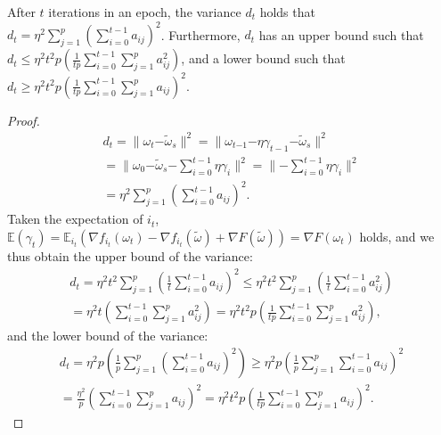 \documentclass[letterpaper]{article}
\begin{document}
\begin{Theorem}
\label{theorem_vr_lower_bound}
   After $t$ iterations in an epoch, the variance $d_t$ holds that $d_t \mathrm{=} \eta^2 \sum\limits_{j=1}^p\left(  \sum\limits_{i=0}^{t-1} a_{ij}  \right)^2$. Furthermore, $d_t$ has an upper bound such that 
   $d_t \mathrm{\le} \eta^2 t^2p  \left( \frac{1}{tp}\sum\limits_{i=0}^{t-1}   \sum\limits_{j=1}^p   a_{ij}^2 \right)$, and a lower bound such that $d_t  \mathrm{\ge} \eta^2t^2p \left(\frac{1}{tp}\sum\limits_{i=0}^{t-1}   \sum\limits_{j=1}^p   a_{ij}\right)^2$.
\end{Theorem}
\begin{proof}
\begin{equation}
\begin{array}{ll}
d_{t} = \parallel \omega_{t}\mathrm{-}\tilde{\omega}_s \parallel^2 
=\parallel \omega_{{t\mathrm{-}1}}\mathrm{-}\eta \gamma_{t-1} \mathrm{-}\tilde{\omega}_s \parallel^2\\
= \parallel \omega_{0}\mathrm{-}\tilde{\omega}_s  \mathrm{-} \sum\limits_{i=0}^{t-1} \eta \gamma_i \parallel^2 
=\parallel \mathrm{-}\sum\limits_{i=0}^{t-1} \eta \gamma_i \parallel^2\\
= \eta^2 \sum\limits_{j=1}^p\left(  \sum\limits_{i=0}^{t-1} a_{ij}  \right)^2.
\end{array}
\end{equation} Taken the expectation of $i_t$,  $\mathbb{E}(\gamma_t) = \mathbb{E}_{i_t}(\nabla f_{i_t}(\omega_t)-\nabla f_{i_t}(\tilde{\omega})+\nabla F(\tilde{\omega})) = \nabla F(\omega_{t})$ holds,   and we thus obtain the upper bound of the variance:
\begin{equation}
\begin{array}{ll}
d_{t} = \eta^2 t^2 \sum\limits_{j=1}^p\left( \frac{1}{t} \sum\limits_{i=0}^{t-1} a_{ij}  \right)^2
\le \eta^2 t^2 \sum\limits_{j=1}^p\left( \frac{1}{t} \sum\limits_{i=0}^{t-1} a_{ij}^2  \right)\\
= \eta^2 t  \left( \sum\limits_{i=0}^{t-1}   \sum\limits_{j=1}^p   a_{ij}^2 \right) 
= \eta^2 t^2p  \left( \frac{1}{tp}\sum\limits_{i=0}^{t-1}   \sum\limits_{j=1}^p   a_{ij}^2 \right),
\end{array}
\end{equation} and the lower bound of the variance:
\begin{equation}
\begin{array}{ll}
d_{t} = \eta^2 p \left( \frac{1}{p} \sum\limits_{j=1}^p\left( \sum\limits_{i=0}^{t-1} a_{ij}  \right)^2\right)
\ge \eta^2 p \left(  \frac{1}{p}  \sum\limits_{j=1}^p \sum\limits_{i=0}^{t-1} a_{ij}  \right)^2\\
= \frac{\eta^2}{p} \left(\sum\limits_{i=0}^{t-1}   \sum\limits_{j=1}^p   a_{ij}\right)^2  
= \eta^2t^2p \left(\frac{1}{tp}\sum\limits_{i=0}^{t-1}   \sum\limits_{j=1}^p   a_{ij}\right)^2.
\end{array}
\end{equation}
\end{proof}
\end{document}

